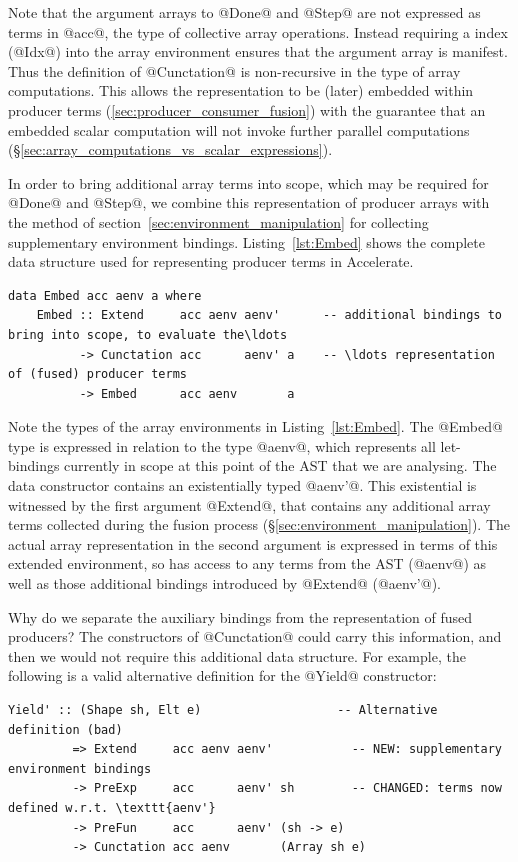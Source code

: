 Note that the argument arrays to @Done@ and @Step@ are not expressed as terms in
@acc@, the type of collective array operations. Instead requiring a  index (@Idx@) into the array environment ensures that the argument array
is manifest. Thus the definition of @Cunctation@ is non-recursive in the type of
array computations. This allows the representation to be (later) embedded within
producer terms (\ref{sec:producer_consumer_fusion}) with the guarantee that an
embedded scalar computation will not invoke further parallel computations
(\S\ref{sec:array_computations_vs_scalar_expressions}).

In order to bring additional array terms into scope, which may be required for
@Done@ and @Step@, we combine this representation of producer arrays with the
method of section~\ref{sec:environment_manipulation} for collecting
supplementary environment bindings. Listing~\ref{lst:Embed} shows the complete
data structure used for representing producer terms in Accelerate.
%
\begin{lstlisting}[style=haskell_float
    ,label=lst:Embed
    ,caption={Representation of fused producer arrays in Accelerate}]
data Embed acc aenv a where
    Embed :: Extend     acc aenv aenv'      -- additional bindings to bring into scope, to evaluate the\ldots
          -> Cunctation acc      aenv' a    -- \ldots representation of (fused) producer terms
          -> Embed      acc aenv       a
\end{lstlisting}

Note the types of the array environments in Listing~\ref{lst:Embed}. The @Embed@
type is expressed in relation to the type @aenv@, which represents all
let-bindings currently in scope at this point of the AST that we are analysing. The data constructor contains an
existentially typed @aenv'@. This existential is witnessed by the first argument
@Extend@, that contains any additional array terms collected during the fusion
process (\S\ref{sec:environment_manipulation}). The actual array representation
in the second argument is expressed in terms of this extended environment, so
has access to any terms from the AST (@aenv@) as well as those additional
bindings introduced by @Extend@ (@aenv'@).

Why do we separate the auxiliary bindings from the representation of fused
producers? The constructors of @Cunctation@ could carry this information,
and then we would not require this additional data structure. For example, the
following is a valid alternative definition for the @Yield@ constructor:
%
\begin{lstlisting}[style=haskell]
  Yield' :: (Shape sh, Elt e)                   -- Alternative definition (bad)
         => Extend     acc aenv aenv'           -- NEW: supplementary environment bindings
         -> PreExp     acc      aenv' sh        -- CHANGED: terms now defined w.r.t. \texttt{aenv'}
         -> PreFun     acc      aenv' (sh -> e)
         -> Cunctation acc aenv       (Array sh e)
\end{lstlisting}

